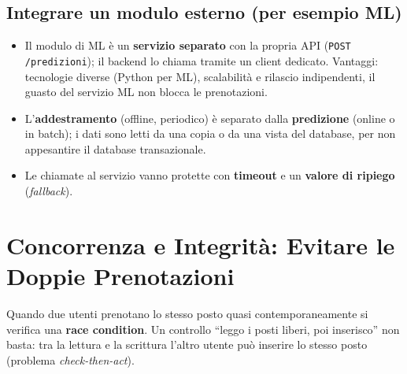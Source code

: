 \subsection{Integrare un modulo esterno (per esempio ML)}
\begin{itemize}
    \item Il modulo di ML è un \textbf{servizio separato} con la propria API (\texttt{POST /predizioni}); il backend lo chiama tramite un client dedicato. Vantaggi: tecnologie diverse (Python per ML), scalabilità e rilascio indipendenti, il guasto del servizio ML non blocca le prenotazioni.
    \item L'\textbf{addestramento} (offline, periodico) è separato dalla \textbf{predizione} (online o in batch); i dati sono letti da una copia o da una vista del database, per non appesantire il database transazionale.
    \item Le chiamate al servizio vanno protette con \textbf{timeout} e un \textbf{valore di ripiego} (\emph{fallback}).
\end{itemize}

\section{Concorrenza e Integrità: Evitare le Doppie Prenotazioni}
Quando due utenti prenotano lo stesso posto quasi contemporaneamente si verifica una \textbf{race condition}. Un controllo ``leggo i posti liberi, poi inserisco'' non basta: tra la lettura e la scrittura l'altro utente può inserire lo stesso posto (problema \emph{check-then-act}).

